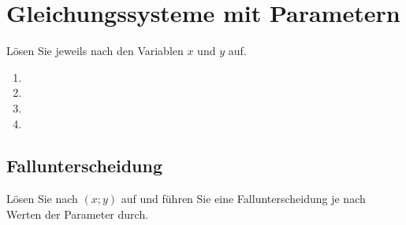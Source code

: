 \section{Gleichungssysteme mit Parametern}

Lösen Sie jeweils nach den Variablen $x$ und $y$ auf.

\begin{enumerate}[label=\alph*)]
\item
{}

\item
{}


\item
{}


\item
{}


\end{enumerate}
\newpage
\subsection{Fallunterscheidung}
Lösen Sie nach $(x;y)$ auf und führen Sie eine Fallunterscheidung je
nach Werten der Parameter durch.

